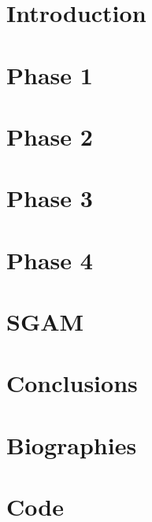 \documentclass[10pt, a4paper]{report}
\begin{document}
\tableofcontents{}


\chapter{Introduction}


\chapter{Phase 1}


\chapter{Phase 2}


\chapter{Phase 3}


\chapter{Phase 4}


\chapter{SGAM}


\chapter{Conclusions}


\chapter{Biographies}


\chapter{Code}


\printbibliography[heading=bibintoc]
\end{document}
